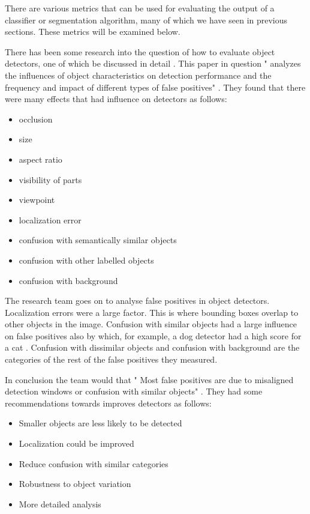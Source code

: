 There are various metrics that can be used for evaluating the output
of a classifier or segmentation algorithm, many of which we have seen in previous
sections. These metrics will be examined below.

There has been some research into the question of how to evaluate object
detectors, one of which be discussed in detail \parencite{diagnosingErrors}.
This paper in question " analyzes the influences of object characteristics on
detection performance and the frequency and impact of different types of false
positives" \parencite{diagnosingErrors}. They found that there were many effects
that had influence on detectors as follows:
\begin{itemize}
    \item{occlusion}
    \item{size}
    \item{aspect ratio}
    \item{visibility of parts}
    \item{viewpoint}
    \item{localization error}
    \item{confusion with semantically similar objects}
    \item{confusion with other labelled objects}
    \item{confusion with background}
\end{itemize}

The research team goes on to analyse false positives in object detectors.
Localization errors were a large factor. This is where bounding boxes overlap to
other objects in the image. Confusion with similar objects had a large influence
on false positives also by which, for example, a dog detector had a high score
for a cat \parencite{diagnosingErrors}. Confusion with dissimilar objects and
confusion with background are the categories of the rest of the false positives
they measured.

In conclusion the team would that " Most false positives are due to misaligned
detection windows or confusion with similar objects"
\parencite{diagnosingErrors}. They had some recommendations towards improves
detectors as follows:
\begin{itemize}
	\item{Smaller objects are less likely to be detected}
	\item{Localization could be improved}
	\item{Reduce confusion with similar categories}
	\item{Robustness to object variation}
	\item{More detailed analysis}
\end{itemize}

